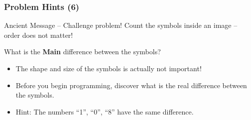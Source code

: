 \begin{frame}
  \frametitle{Problem Hints (6)}
  \begin{block}{Ancient Message -- Challenge problem!}
    Count the symbols inside an image -- order does not matter!

    \bigskip

    What is the {\bf Main} difference between the symbols?
  \end{block}

  \begin{itemize}
  \item The shape and size of the symbols is actually not important!
  \item Before you begin programming, discover what is the real
    difference between the symbols.
  \item Hint: The numbers ``1'', ``0'', ``8'' have the same difference.
  \end{itemize}
\end{frame}
